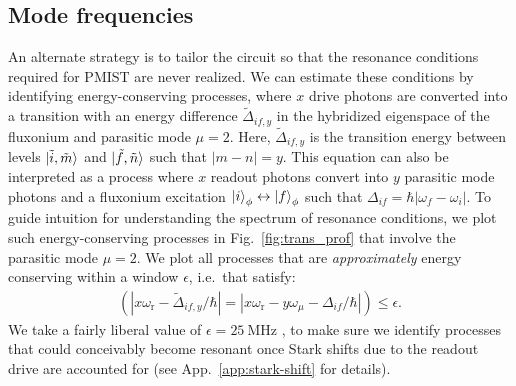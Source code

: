 \documentclass[%
reprint,
superscriptaddress,
 amsmath,amssymb,
 aps,
 prx,
longbibliography,
floatfix,
]{revtex4-2}
\begin{document}
\subsection{Mode frequencies}\label{mode-frequencies}

An alternate strategy is to tailor the circuit so that the resonance conditions required for PMIST are never realized. We can estimate these conditions by identifying energy-conserving processes, where $x$ drive photons are converted into a transition with an energy difference $\tilde{\Delta}_{if,y}$ in the hybridized eigenspace of the fluxonium and parasitic mode $\mu=2$. Here, $\tilde{\Delta}_{if,y}$ is the transition energy between levels $\ket{\tilde{i},\tilde{m}}$ and $\ket{\tilde{f},\tilde{n}}$ such that $|m-n|=y$. 
This equation can also be interpreted as a process where $x$ readout photons convert into $y$ parasitic mode photons and a fluxonium excitation $\ket{i}_\phi \leftrightarrow \ket{f}_\phi$ such that $\Delta_{if}=\hbar|\omega_f-\omega_i|$. To guide intuition for understanding the spectrum of resonance conditions, we plot such energy-conserving processes in Fig.~\ref{fig:trans_prof} that involve the parasitic mode $\mu=2$.
We plot all processes that are {\it approximately} energy conserving within a window $\epsilon$, i.e.~that satisfy:
\begin{align}
\left(
    |x\omega_\textrm{r}-\tilde{\Delta}_{if,y}/\hbar| = 
|x\omega_\textrm{r}-y\omega_\mu-\Delta_{if}/\hbar| \right) \le \epsilon.
\label{eq:En_cons}
\end{align}
We take a fairly liberal value of $\epsilon = 25 \ \textrm{MHz}$ , to make sure we identify processes that could conceivably become resonant once Stark shifts due to the readout drive are accounted for (see App.~\ref{app:stark-shift} for details).
\end{document}
